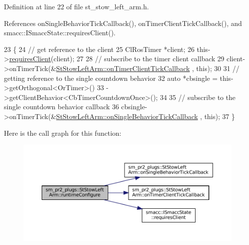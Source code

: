 Definition at line 22 of file st\+\_\+stow\+\_\+left\+\_\+arm.\+h.



References on\+Single\+Behavior\+Tick\+Callback(), on\+Timer\+Client\+Tick\+Callback(), and smacc\+::\+I\+Smacc\+State\+::requires\+Client().


\begin{DoxyCode}
23     \{
24         \textcolor{comment}{// get reference to the client}
25         ClRosTimer *client;
26         this->\hyperlink{classsmacc_1_1ISmaccState_a7f95c9f0a6ea2d6f18d1aec0519de4ac}{requiresClient}(client);
27 
28         \textcolor{comment}{// subscribe to the timer client callback}
29         client->onTimerTick(&\hyperlink{structsm__pr2__plugs_1_1StStowLeftArm_a9a93ba44d99b53a4800aeae059ea5bc4}{StStowLeftArm::onTimerClientTickCallback}
      , \textcolor{keyword}{this});
30 
31         \textcolor{comment}{// getting reference to the single countdown behavior}
32         \textcolor{keyword}{auto} *cbsingle = this->getOrthogonal<OrTimer>()
33                              ->getClientBehavior<CbTimerCountdownOnce>();
34 
35         \textcolor{comment}{// subscribe to the single countdown behavior callback}
36         cbsingle->onTimerTick(&\hyperlink{structsm__pr2__plugs_1_1StStowLeftArm_ac59caffbdba0918475f0778081742b40}{StStowLeftArm::onSingleBehaviorTickCallback}
      , \textcolor{keyword}{this});
37     \}
\end{DoxyCode}
Here is the call graph for this function\+:
\nopagebreak
\begin{figure}[H]
\begin{center}
\leavevmode
\includegraphics[width=350pt]{structsm__pr2__plugs_1_1StStowLeftArm_af3124c3f8bc9a03f7af8c49dd0469856_cgraph}
\end{center}
\end{figure}
\mbox{\label{structsm__pr2__plugs_1_1StStowLeftArm_a3075009fd893f157279494836e4af96d}} 

